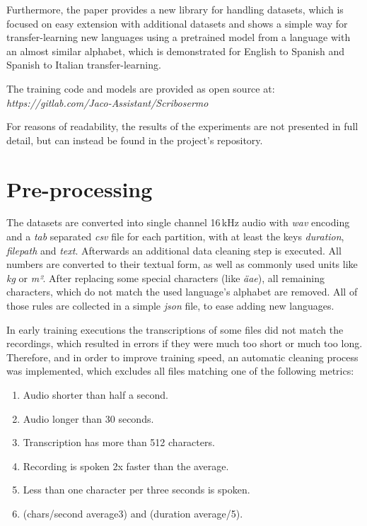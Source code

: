 \documentclass[a4paper]{article}
\begin{document}
Furthermore, the paper provides a new library for handling datasets, which is focused on easy extension with additional datasets and shows a simple way for transfer-learning new languages using a pretrained model from a language with an almost similar alphabet, which is demonstrated for English to Spanish and Spanish to Italian transfer-learning.

The training code and models are provided as open source at: \textit{https://gitlab.com/Jaco-Assistant/Scribosermo}

\noindent For reasons of readability, the results of the experiments are not presented in full detail, but can instead be found in the project's repository.


\section{Pre-processing}
\label{sec:prep}

The datasets are converted into single channel 16\,kHz audio with \textit{wav} encoding and a \textit{tab} separated \textit{csv} file for each partition, with at least the keys \textit{duration}, \textit{filepath} and \textit{text}. Afterwards an additional data cleaning step is executed.
All numbers are converted to their textual form, as well as commonly used units like \textit{kg} or \textit{m²}. After replacing some special characters (like \textit{ä}\textrightarrow{}\textit{ae}), all remaining characters, which do not match the used language's alphabet are removed. All of those rules are collected in a simple \textit{json} file, to ease adding new languages. 

In early training executions the transcriptions of some files did not match the recordings, which resulted in errors if they were much too short or much too long. Therefore, and in order to improve training speed, an automatic cleaning process was implemented, which excludes all files matching one of the following metrics:

\begin{enumerate}
	\itemsep0.1em
	\item Audio shorter than half a second.
	\item Audio longer than 30 seconds.
	\item Transcription has more than 512 characters.
	\item Recording is spoken 2x faster than the average.
	\item Less than one character per three seconds is spoken.
	\item (chars/second  average3) and (duration  average/5).
\end{enumerate}
\end{document}
